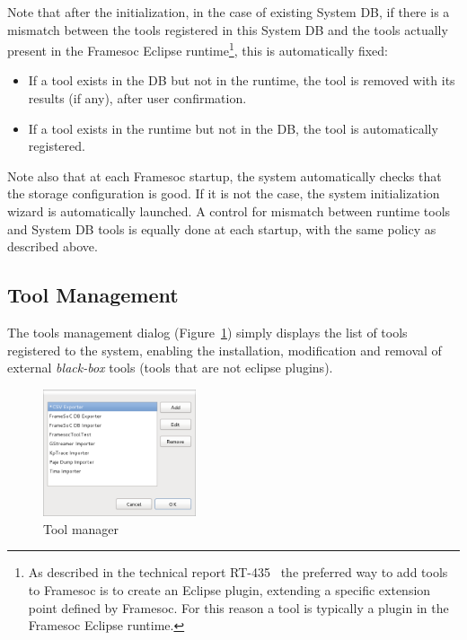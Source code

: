 \documentclass[twoside]{article}
\begin{document}
\begin{sloppypar}
Note that after the initialization, in the case of existing System DB, if there is a mismatch between the tools registered in this System DB and the tools actually present in the Framesoc Eclipse runtime\footnote{As described in the technical report RT-435~\cite{pagano:hal-00830008} the preferred way to add tools to Framesoc is to create an Eclipse plugin, extending a specific extension point defined by Framesoc. For this reason a tool is typically a plugin in the Framesoc Eclipse runtime.}, this is automatically fixed:
\begin{itemize}
 \item If a tool exists in the DB but not in the runtime, the tool is removed with its results (if any), after user confirmation.
 \item If a tool exists in the runtime but not in the DB, the tool is automatically registered.
\end{itemize}
Note also that at each Framesoc startup, the system automatically checks that the storage configuration is good. 
If it is not the case, the system initialization wizard is automatically launched.
A control for mismatch between runtime tools and System DB tools is equally done at each startup, with the same policy as described above.

\subsection{Tool Management}
\label{subsec:tools}

The tools management dialog (Figure~\ref{fig:manage_tools}) simply displays the list of tools registered to the system, 
enabling the installation, modification and removal of external \emph{black-box} tools (tools that are not eclipse plugins).

\begin{figure}[h!]
  \centering
    \includegraphics[width=0.4\textwidth]{images/manage_tools.png}
  \caption{Tool manager}
  \label{fig:manage_tools}
\end{figure}


\end{sloppypar}
\end{document}

